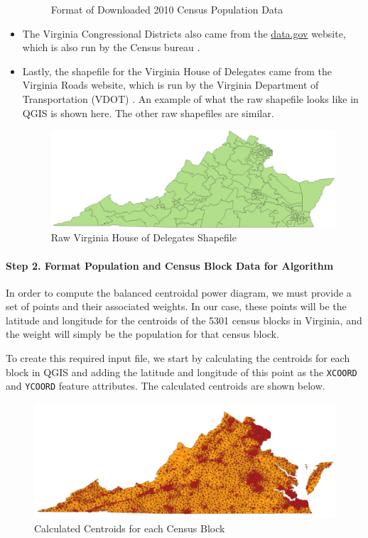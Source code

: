 \documentclass[11pt]{article}
\begin{document}
\begin{itemize}
\begin{figure}[H]
		\caption{Format of Downloaded 2010 Census Population Data}
		\label{fig:dewnfnfwieof}
	\end{figure}
	\item The Virginia Congressional Districts also came from the \url{data.gov} website, which is also run by the Census bureau \cite{VA_CD_116}.
	\item Lastly, the shapefile for the Virginia House of Delegates came from the Virginia Roads website, which is run by the Virginia Department of Transportation (VDOT) \cite{VA_Roads}. An example of what the raw shapefile looks like in QGIS is shown here. The other raw shapefiles are similar.
	\begin{figure}[H]
		\centering
		\includegraphics[width=.6\textwidth]{DelegatesRaw}
		\caption{Raw Virginia House of Delegates Shapefile}
		\label{fig:delegatesraw}
	\end{figure}
\end{itemize}

\paragraph{Step 2. Format Population and Census Block Data for Algorithm}
In order to compute the balanced centroidal power diagram, we must provide a set of points and their associated weights. In our case, these points will be the latitude and longitude for the centroids of the 5301 census blocks in Virginia, and the weight will simply be the population for that census block.

\medskip

To create this required input file, we start by calculating the centroids for each block in QGIS and adding the latitude and longitude of this point as the \texttt{XCOORD} and \texttt{YCOORD} feature attributes. The calculated centroids are shown below.
\begin{figure}[H]
	\centering
	\includegraphics[width=.55\textwidth]{CensusBlockCentroids}
	\caption{Calculated Centroids for each Census Block}
	\label{fig:doredistricrewrwet}
\end{figure}
\end{document}
